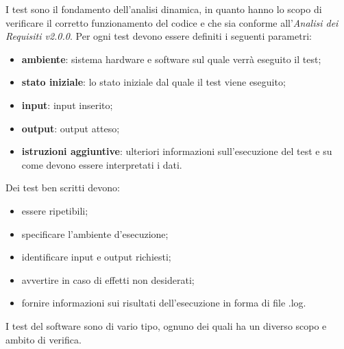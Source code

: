 I test sono il fondamento dell'analisi dinamica, in quanto hanno lo scopo di verificare il corretto funzionamento del codice e che sia conforme all'\textit{Analisi dei Requisiti v2.0.0}.
Per ogni test devono essere definiti i seguenti parametri:
\begin{itemize}
    \item \textbf{ambiente}: sistema hardware e software sul quale verrà eseguito il test;
    \item \textbf{stato iniziale}: lo stato iniziale dal quale il test viene eseguito;
    \item \textbf{input}: input inserito;
    \item \textbf{output}: output atteso;
    \item \textbf{istruzioni aggiuntive}: ulteriori informazioni sull'esecuzione del test e su come devono essere interpretati i dati.
\end{itemize}
Dei test ben scritti devono:
\begin{itemize}
    \item essere ripetibili;
    \item specificare l'ambiente d'esecuzione;
    \item identificare input e output richiesti;
    \item avvertire in caso di effetti non desiderati;
    \item fornire informazioni sui risultati dell'esecuzione in forma di file {\selectfont .log}.
\end{itemize}
I test del software sono di vario tipo, ognuno dei quali ha un diverso scopo e ambito di verifica.
